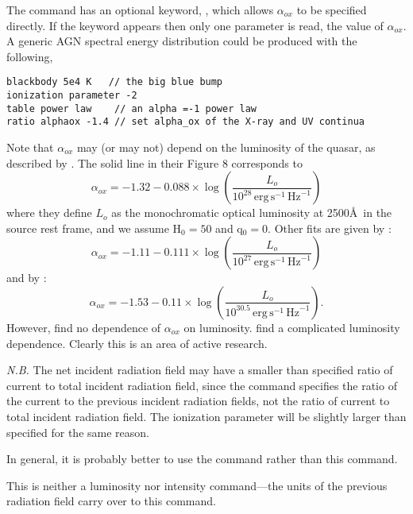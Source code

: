 The  command has an optional keyword,
, which allows $\alpha_{ox}$
to be specified directly.
If the keyword appears then only one parameter
is read, the value of $\alpha_{ox}$.
A generic AGN spectral energy distribution could be produced with
the following,
\begin{verbatim}
blackbody 5e4 K   // the big blue bump
ionization parameter -2
table power law    // an alpha =-1 power law
ratio alphaox -1.4 // set alpha_ox of the X-ray and UV continua
\end{verbatim}
Note that $\alpha_{ox}$ may (or may not) depend on the luminosity of the quasar,
as described by \citet{Avni1986}.
The solid line in their Figure 8 corresponds to
\begin{equation}
\alpha _{ox}  =  - 1.32 - 0.088 \times \log \left( {\frac{{L_o }}{{10^{28}
\,{\mathrm{erg}}\,{\mathrm{s}}^{ - {\mathrm{1}}} \,{\mathrm{Hz}}^{ - {\mathrm{1}}} }}} \right)%
\end{equation}
where they define $L_o$ as the monochromatic optical luminosity
at 2500\AA\  in the source rest frame,
and we assume H$_0 = 50$ and q$_0 = 0$.
Other fits are given
by \citet{Worrall1987}:
\begin{equation}
\alpha _{ox}  =  - 1.11 - 0.111 \times \log \left( {\frac{{L_o }}{{10^{27}
\,{\mathrm{erg}}\,{\mathrm{s}}^{ - {\mathrm{1}}} \,{\mathrm{Hz}}^{ - {\mathrm{1}}} }}} \right)%
\end{equation}
and by \citet{Wilkes1994}:
\begin{equation}
\alpha _{ox}  =  - 1.53 - 0.11 \times \log \left( {\frac{{L_o }}{{10^{30.5}
\,{\mathrm{erg}}\,{\mathrm{s}}^{ - {\mathrm{1}}} \,{\mathrm{Hz}}^{ - {\mathrm{1}}} }}} \right)
.%
\end{equation}
However, \citet{LaFranca1995} find no dependence
of $\alpha_{ox}$ on luminosity.
\citet{Avni1995} find a complicated luminosity dependence.
Clearly this is an area of active research.

\emph{N.B.}  The net incident radiation field may have a
smaller than specified ratio of current
to total incident radiation field,
since the command specifies the ratio of the current
to the previous incident radiation fields,
not the ratio of current to total incident radiation field.
The ionization parameter will be slightly larger than
specified for the same reason.

In general, it is probably better to use the  command
rather than this command.

This is neither a luminosity nor intensity command---the units
of the previous radiation field carry over to this command.

